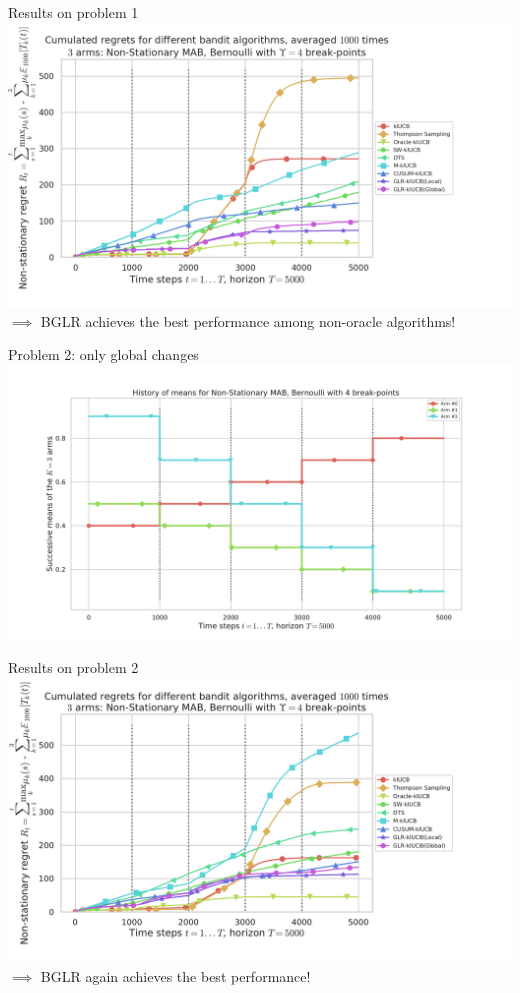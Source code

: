 \documentclass[11pt,english,ignorenonframetext,]{beamer}
\begin{document}
\begin{frame}[plain]{Results on problem 1}
  \centering
  \includegraphics[width=1.15\textwidth]{figures/regret_problem1.png}
  $\implies$ BGLR achieves the best performance among non-oracle algorithms!
\end{frame}


\begin{frame}[plain]{Problem 2: only global changes}
  \centering
  \includegraphics[width=1.15\textwidth]{figures/Problem_2.pdf}
\end{frame}

\begin{frame}[plain]{Results on problem 2}
  \centering
  \includegraphics[width=1.15\textwidth]{figures/regret_problem2.pdf}
  $\implies$ BGLR again achieves the best performance!
\end{frame}
\end{document}
